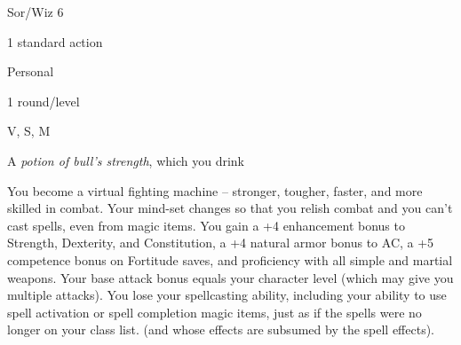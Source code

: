 
\begin{description*}
\item[Level:] Sor/Wiz 6
\item[Casting Time:] 1 standard action
\item[Range:] Personal
\item[Duration:] 1 round/level
\item[Components:] V, S, M
\item[Arcane Material Component:] A \textit{potion of bull's strength}, which you drink
\end{description*}

You become a virtual fighting machine --  stronger, tougher, faster, and more skilled
in combat. Your mind-set changes so that you relish combat and you can't cast spells,
even from magic items.
You gain a +4 enhancement bonus to Strength, Dexterity, and Constitution, a +4
natural armor bonus to AC, a +5 competence bonus on Fortitude saves, and proficiency
with all simple and martial weapons. Your base attack bonus equals your character
level (which may give you multiple attacks).
You lose your spellcasting ability, including your ability to use spell activation
or spell completion magic items, just as if the spells were no longer on your class
list.
(and whose effects are subsumed by the spell effects).